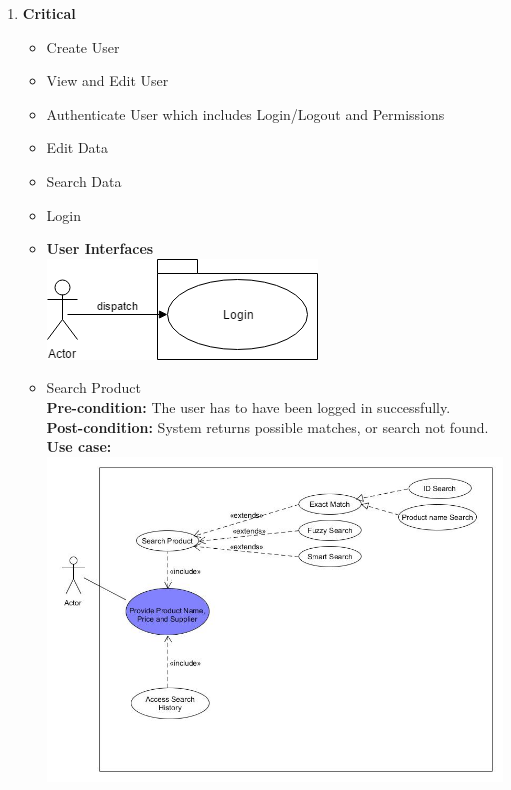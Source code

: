 \documentclass[a4paper,10pt]{article}
\begin{document}
		\begin{enumerate} 
		\item \textbf{Critical} 
		\begin{itemize}
		\item Create User
		\item View and Edit User
		\item Authenticate User which includes Login/Logout and Permissions
		\item Edit Data
		\item Search Data
		\end{itemize}
			\begin{itemize} 
				\item Login
                 \item \textbf{User Interfaces}\\
		 \includegraphics[scale=0.62]{login.png}\\
		 
				\item Search Product \\
				\textbf{Pre-condition: } The user has to have been logged in successfully.  \\
				\textbf{Post-condition: }  System returns possible matches, or search not found. \\
				\textbf{Use case: }\\
 				\includegraphics[scale=0.35]{Diagrams/SearchUCdiagram2.jpg}
				

\end{itemize}
\end{enumerate}
\end{document}

